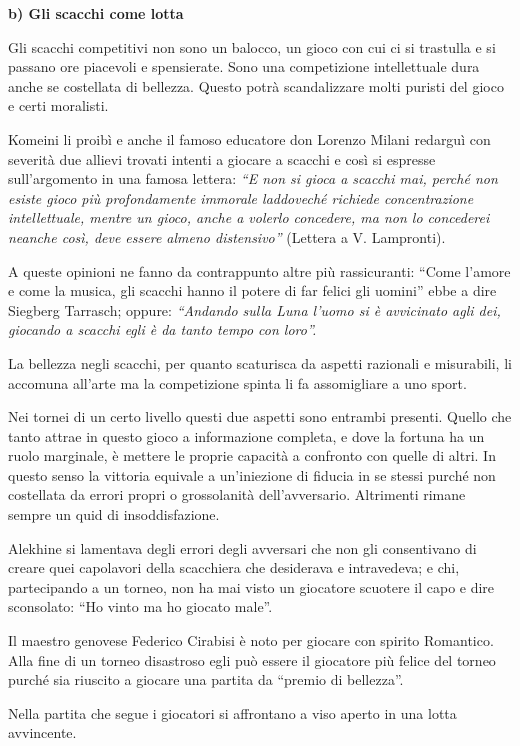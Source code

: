 \textbf{b) Gli scacchi come lotta}

Gli scacchi competitivi non sono un balocco, un gioco con cui ci si
trastulla e si passano ore piacevoli e spensierate. Sono una
competizione intellettuale dura anche se costellata di bellezza. Questo
potrà scandalizzare molti puristi del gioco e certi moralisti.

Komeini li proibì e anche il famoso educatore don Lorenzo Milani
redarguì con severità due allievi trovati intenti a giocare a scacchi e
così si espresse sull'argomento in una famosa lettera: \emph{``E non si
gioca a scacchi mai, perché non esiste gioco più profondamente immorale
laddoveché richiede concentrazione intellettuale, mentre un gioco, anche
a volerlo concedere, ma non lo concederei neanche così, deve essere
almeno distensivo''} (Lettera a V. Lampronti).

A queste opinioni ne fanno da contrappunto altre più rassicuranti:
``Come l'amore e come la musica, gli scacchi hanno il potere di far
felici gli uomini'' ebbe a dire Siegberg Tarrasch; oppure:
\emph{``Andando sulla Luna l'uomo si è avvicinato agli dei, giocando a
scacchi egli è da tanto tempo con loro''.}

La bellezza negli scacchi, per quanto scaturisca da aspetti razionali e
misurabili, li accomuna all'arte ma la competizione spinta li fa
assomigliare a uno sport.

Nei tornei di un certo livello questi due aspetti sono entrambi
presenti. Quello che tanto attrae in questo gioco a informazione
completa, e dove la fortuna ha un ruolo marginale, è mettere le proprie
capacità a confronto con quelle di altri. In questo senso la vittoria
equivale a un'iniezione di fiducia in se stessi purché non costellata da
errori propri o grossolanità dell'avversario. Altrimenti rimane sempre
un quid di insoddisfazione.

Alekhine si lamentava degli errori degli avversari che non gli
consentivano di creare quei capolavori della scacchiera che desiderava e
intravedeva; e chi, partecipando a un torneo, non ha mai visto un
giocatore scuotere il capo e dire sconsolato: ``Ho vinto ma ho giocato
male''.

Il maestro genovese Federico Cirabisi è noto per giocare con spirito
Romantico. Alla fine di un torneo disastroso egli può essere il
giocatore più felice del torneo purché sia riuscito a giocare una
partita da ``premio di bellezza''.

Nella partita che segue i giocatori si affrontano a viso aperto in una
lotta avvincente.

